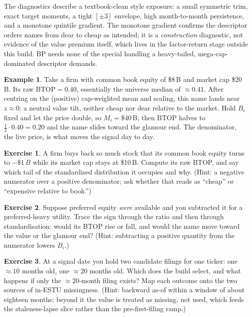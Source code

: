 \documentclass[11pt]{article}
\theoremstyle{definition}
\newtheorem{example}{Example}[section]
\newtheorem{exercise}{Exercise}[section]
\theoremstyle{plain}
\theoremstyle{remark}
\newcommand{\half}{\tfrac12}
\begin{document}
\begin{keyresult}
The diagnostics describe a textbook-clean style exposure: a small symmetric trim, exact target moments, a tight $[\pm 3]$ envelope, high month-to-month persistence, and a monotone quintile gradient. The monotone gradient confirms the descriptor orders names from dear to cheap as intended; it is a \emph{construction} diagnostic, not evidence of the value premium itself, which lives in the factor-return stage outside this build. BP needs none of the special handling a heavy-tailed, mega-cap-dominated descriptor demands.
\end{keyresult}

\begin{example}
Take a firm with common book equity of \$8\,B and market cap \$20\,B. Its raw $\mathrm{BTOP} = 0.40$, essentially the universe median of $\approx 0.41$. After centring on the (positive) cap-weighted mean and scaling, this name lands near $z \approx 0$: a neutral value tilt, neither cheap nor dear relative to the market. Hold $B_i$ fixed and let the price double, so $M_i = \$40$\,B; then $\mathrm{BTOP}$ halves to $\half\cdot 0.40 = 0.20$ and the name slides toward the glamour end. The denominator, the live price, is what moves the signal day to day.
\end{example}

\begin{exercise}
A firm buys back so much stock that its common book equity turns to $-\$1\,B$ while its market cap stays at \$10\,B. Compute its raw BTOP, and say which tail of the standardised distribution it occupies and why. (Hint: a negative numerator over a positive denominator; ask whether that reads as ``cheap'' or ``expensive relative to book.'')
\end{exercise}

\begin{exercise}
Suppose preferred equity \emph{were} available and you subtracted it for a preferred-heavy utility. Trace the sign through the ratio and then through standardisation: would its BTOP rise or fall, and would the name move toward the value or the glamour end? (Hint: subtracting a positive quantity from the numerator lowers $B_i$.)
\end{exercise}

\begin{exercise}
At a signal date you hold two candidate filings for one ticker: one $\approx 10$ months old, one $\approx 20$ months old. Which does the build select, and what happens if only the $\approx 20$-month filing exists? Map each outcome onto the two sources of in-ESTU missingness. (Hint: backward as-of within a window of about eighteen months; beyond it the value is treated as missing, not used, which feeds the staleness-lapse slice rather than the pre-first-filing ramp.)
\end{exercise}
\end{document}
